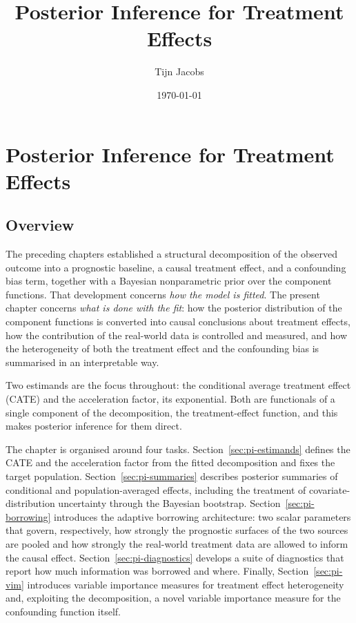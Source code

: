 \documentclass[11pt]{report}
\title{Posterior Inference for Treatment Effects}
\author{Tijn Jacobs}
\date{\today}
\theoremstyle{plain}
\theoremstyle{definition}
\theoremstyle{remark}
\newcommand{\1}{\mathds{1}}
\theoremstyle{plain}
\theoremstyle{remark}
\begin{document}
\chapter{Posterior Inference for Treatment Effects}
\label{ch:posterior-inference}

\section{Overview}
\label{sec:pi-overview}

The preceding chapters established a structural decomposition of the observed
outcome into a prognostic baseline, a causal treatment effect, and a
confounding bias term, together with a Bayesian nonparametric prior over the
component functions. That development concerns \emph{how the model is fitted}.
The present chapter concerns \emph{what is done with the fit}: how the posterior
distribution of the component functions is converted into causal conclusions
about treatment effects, how the contribution of the real-world data is
controlled and measured, and how the heterogeneity of both the treatment effect
and the confounding bias is summarised in an interpretable way.

Two estimands are the focus throughout: the conditional average treatment
effect (CATE) and the acceleration factor, its exponential. Both are functionals
of a single component of the decomposition, the treatment-effect function, and
this makes posterior inference for them direct.

The chapter is organised around four tasks. Section~\ref{sec:pi-estimands}
defines the CATE and the acceleration factor from the fitted decomposition and
fixes the target population. Section~\ref{sec:pi-summaries} describes posterior
summaries of conditional and population-averaged effects, including the
treatment of covariate-distribution uncertainty through the Bayesian bootstrap.
Section~\ref{sec:pi-borrowing} introduces the adaptive borrowing architecture:
two scalar parameters that govern, respectively, how strongly the prognostic
surfaces of the two sources are pooled and how strongly the real-world treatment
data are allowed to inform the causal effect.
Section~\ref{sec:pi-diagnostics} develops a suite of diagnostics that report how
much information was borrowed and where. Finally, Section~\ref{sec:pi-vim}
introduces variable importance measures for treatment effect heterogeneity and,
exploiting the decomposition, a novel variable importance measure for the
confounding function itself.
\end{document}
